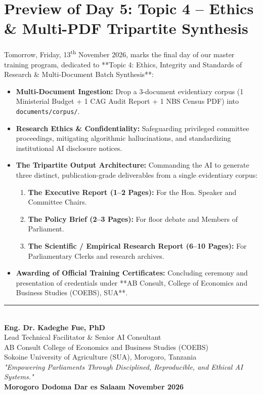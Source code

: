 \documentclass[11pt, a4paper]{report}
\begin{document}
\section{Preview of Day 5: Topic 4 -- Ethics \& Multi-PDF Tripartite Synthesis}
Tomorrow, Friday, 13\textsuperscript{th} November 2026, marks the final day of our master training program, dedicated to **Topic 4: Ethics, Integrity and Standards of Research \& Multi-Document Batch Synthesis**:
\begin{itemize}[label=-]
    \item \textbf{Multi-Document Ingestion:} Drop a 3-document evidentiary corpus (1 Ministerial Budget + 1 CAG Audit Report + 1 NBS Census PDF) into \texttt{documents/corpus/}.
    \item \textbf{Research Ethics \& Confidentiality:} Safeguarding privileged committee proceedings, mitigating algorithmic hallucinations, and standardizing institutional AI disclosure notices.
    \item \textbf{The Tripartite Output Architecture:} Commanding the AI to generate three distinct, publication-grade deliverables from a single evidentiary corpus:
    \begin{enumerate}
        \item \textbf{The Executive Report (1--2 Pages):} For the Hon. Speaker and Committee Chairs.
        \item \textbf{The Policy Brief (2--3 Pages):} For floor debate and Members of Parliament.
        \item \textbf{The Scientific / Empirical Research Report (6--10 Pages):} For Parliamentary Clerks and research archives.
    \end{enumerate}
    \item \textbf{Awarding of Official Training Certificates:} Concluding ceremony and presentation of credentials under **AB Consult, College of Economics and Business Studies (COEBS), SUA**.
\end{itemize}

\vspace{1.5cm}
\begin{center}
    \rule{0.65\textwidth}{0.4pt}\\[0.3cm]
    \textbf{\Large Eng. Dr. Kadeghe Fue, PhD}\\
    Lead Technical Facilitator \& Senior AI Consultant\\
    AB Consult \textbullet{} College of Economics and Business Studies (COEBS)\\
    Sokoine University of Agriculture (SUA), Morogoro, Tanzania\\[0.3cm]
    \small\textit{"Empowering Parliaments Through Disciplined, Reproducible, and Ethical AI Systems."}\\[0.5cm]
    \textbf{Morogoro \textbullet{} Dodoma \textbullet{} Dar es Salaam \textbullet{} November 2026}
\end{center}
\end{document}
